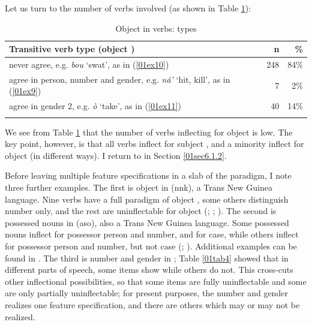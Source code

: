 \documentclass[output=paper,colorlinks,citecolor=brown]{langscibook}
\begin{document}
Let us turn to the number of verbs involved (as shown in Table \ref{01tab7}):

\begin{table}[ht]
	\caption{Object  in  verbs: types \citep[293]{fedden2022}}
	\label{01tab7}
	\begin{tabularx}{\textwidth}{lrr}
		\lsptoprule
			Transitive verb type (object \isi{agreement}) & n & \% \\
			\midrule
			never agree, e.g. \textit{bou} ‘swat’, as in (\ref{01ex10}) & 248 & 84\% \\
			agree in person, number and gender, e.g. \textit{nâ’} ‘hit, kill’, as in (\ref{01ex9}) & 7 & 2\% \\
			agree in gender 2, e.g. \textit{ò} ‘take’, as in (\ref{01ex11}) & 40 & 14\% \\
		\lspbottomrule
	\end{tabularx}
\end{table}

We see from Table \ref{01tab7} that the number of verbs inflecting for object  is low. The key point, however, is that all verbs inflect for subject , and a minority inflect for object  (in different ways). I return to  in Section \ref{01sec6.1.2}.

Before leaving multiple feature specifications in a slab of the paradigm, I note three further examples. The first is object  in  (nnk), a Trans New Guinea language. Nine verbs have a full paradigm of object , some others distinguish number only, and the rest are uninflectable for object  (\citealt[40--42]{spauldingspaulding1994}; \citealt[164n15]{corbett2012}; \citealt{feddenpaciaroni2022}). The second is possessed nouns in  (aso), also a Trans New Guinea language. Some possessed nouns inflect for possessor person and number, and for case, while others inflect for possessor person and number, but not case (\citealt{strange1972}; \citealt[10--12, 28]{baermanbrowncorbett2017}). Additional examples can be found in \citet{windschuttel2019}. The third is number and gender  in ; Table \ref{01tab4} showed that in different parts of speech, some items show  while others do not. This cross-cuts other inflectional possibilities, so that some items are fully uninflectable and some are only partially uninflectable; for present purposes, the number and gender  realizes one feature specification, and there are others which may or may not be realized.
\end{document}
